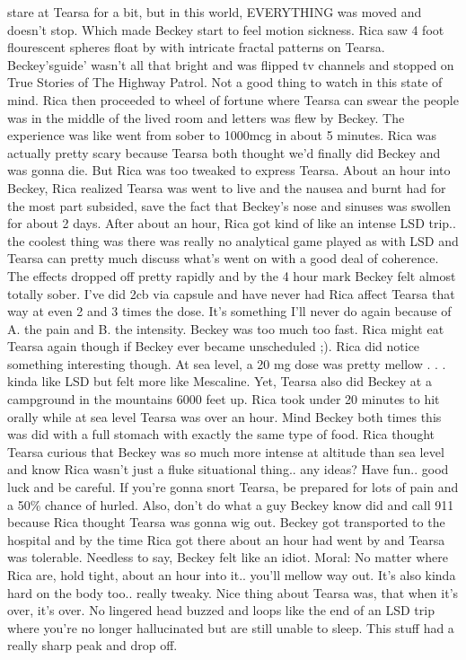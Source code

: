 \documentclass[12pt]{book}
\begin{document}
stare at Tearsa for a bit, but in this world, EVERYTHING was moved and doesn't stop. Which made Beckey start to feel motion sickness. Rica saw 4 foot flourescent spheres float by with intricate fractal patterns on Tearsa. Beckey'sguide' wasn't all that bright and was flipped tv channels and stopped on True Stories of The Highway Patrol. Not a good thing to watch in this state of mind. Rica then proceeded to wheel of fortune where Tearsa can swear the people was in the middle of the lived room and letters was flew by Beckey. The experience was like went from sober to 1000mcg in about 5 minutes. Rica was actually pretty scary because Tearsa both thought we'd finally did Beckey and was gonna die. But Rica was too tweaked to express Tearsa. About an hour into Beckey, Rica realized Tearsa was went to live and the nausea and burnt had for the most part subsided, save the fact that Beckey's nose and sinuses was swollen for about 2 days. After about an hour, Rica got kind of like an intense LSD trip.. the coolest thing was there was really no analytical game played as with LSD and Tearsa can pretty much discuss what's went on with a good deal of coherence. The effects dropped off pretty rapidly and by the 4 hour mark Beckey felt almost totally sober. I've did 2cb via capsule and have never had Rica affect Tearsa that way at even 2 and 3 times the dose. It's something I'll never do again because of A. the pain and B. the intensity. Beckey was too much too fast. Rica might eat Tearsa again though if Beckey ever became unscheduled ;). Rica did notice something interesting though. At sea level, a 20 mg dose was pretty mellow . . .  kinda like LSD but felt more like Mescaline. Yet, Tearsa also did Beckey at a campground in the mountains 6000 feet up. Rica took under 20 minutes to hit orally while at sea level Tearsa was over an hour. Mind Beckey both times this was did with a full stomach with exactly the same type of food. Rica thought Tearsa curious that Beckey was so much more intense at altitude than sea level and know Rica wasn't just a fluke situational thing.. any ideas? Have fun.. good luck and be careful. If you're gonna snort Tearsa, be prepared for lots of pain and a 50\% chance of hurled. Also, don't do what a guy Beckey know did and call 911 because Rica thought Tearsa was gonna wig out. Beckey got transported to the hospital and by the time Rica got there about an hour had went by and Tearsa was tolerable. Needless to say, Beckey felt like an idiot. Moral: No matter where Rica are, hold tight, about an hour into it.. you'll mellow way out. It's also kinda hard on the body too.. really tweaky. Nice thing about Tearsa was, that when it's over, it's over. No lingered head buzzed and loops like the end of an LSD trip where you're no longer hallucinated but are still unable to sleep. This stuff had a really sharp peak and drop off.
\end{document}
